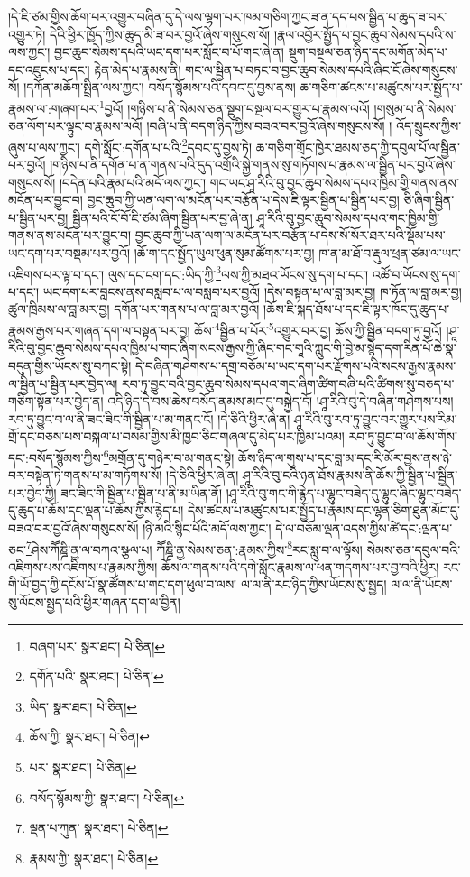 །དེ་ཇི་ཙམ་གྱིས་ཆོག་པར་འགྱུར་བཞིན་དུ་དེ་ལས་ལྷག་པར་ཁམ་གཅིག་ཀྱང་ཟ་ན་དད་པས་སྦྱིན་པ་ཆུད་ཟ་བར་འགྱུར་ཏེ། དེའི་ཕྱིར་ཁྱོད་ཀྱིས་ཆུད་མི་ཟ་བར་བྱའོ་ཞེས་གསུངས་སོ། །རྣལ་འབྱོར་སྤྱོད་པ་བྱང་ཆུབ་སེམས་དཔའི་ས་ལས་ཀྱང་། བྱང་ཆུབ་སེམས་དཔའི་ཡང་དག་པར་སློང་བ་པོ་གང་ཞེ་ན། སྡུག་བསྔལ་ཅན་ཉིད་དང་མགོན་མེད་པ་དང་འཇུངས་པ་དང་། རྟེན་མེད་པ་རྣམས་ནི། གང་ལ་སྦྱིན་པ་བཏང་བ་བྱང་ཆུབ་སེམས་དཔའི་ཞིང་ངོ་ཞེས་གསུངས་སོ། །དཀོན་མཆོག་སྤྲིན་ལས་ཀྱང་། བསོད་སྙོམས་པའི་དབང་དུ་བྱས་ནས། ཆ་གཅིག་ཚངས་པ་མཚུངས་པར་སྤྱོད་པ་རྣམས་ལ་:གཞག་པར་\footnote{བཞག་པར་  སྣར་ཐང་།  པེ་ཅིན། }བྱའོ། །གཉིས་པ་ནི་སེམས་ཅན་སྡུག་བསྔལ་བར་གྱུར་པ་རྣམས་ལའོ། །གསུམ་པ་ནི་སེམས་ཅན་ལོག་པར་ལྟུང་བ་རྣམས་ལའོ། །བཞི་པ་ནི་བདག་ཉིད་ཀྱིས་བཟའ་བར་བྱའོ་ཞེས་གསུངས་སོ། །
འོད་སྲུངས་ཀྱིས་ཞུས་པ་ལས་ཀྱང་། དགེ་སློང་:དགོན་པ་པའི་\footnote{དགོན་པའི་  སྣར་ཐང་།  པེ་ཅིན། }དབང་དུ་བྱས་ཏེ། ཆ་གཅིག་གྲོང་ཁྱེར་ཐམས་ཅད་ཀྱི་དབུལ་པོ་ལ་སྦྱིན་པར་བྱའོ། །གཉིས་པ་ནི་དགོན་པ་ན་གནས་པའི་དུད་འགྲོའི་སྐྱེ་གནས་སུ་གཏོགས་པ་རྣམས་ལ་སྦྱིན་པར་བྱའོ་ཞེས་གསུངས་སོ། །བདེན་པའི་རྣམ་པའི་མདོ་ལས་ཀྱང་། གང་ཡང་ཤཱ་རིའི་བུ་བྱང་ཆུབ་སེམས་དཔའ་ཁྱིམ་གྱི་གནས་ནས་མངོན་པར་བྱུང་བ། བྱང་ཆུབ་ཀྱི་ཡན་ལག་ལ་མངོན་པར་བརྩོན་པ་དེས་ཇི་ལྟར་སྦྱིན་པ་སྦྱིན་པར་བྱ། ཅི་ཞིག་སྦྱིན་པ་སྦྱིན་པར་བྱ། སྦྱིན་པའི་ངོ་བོ་ཇི་ཙམ་ཞིག་སྦྱིན་པར་བྱ་ཞེ་ན། ཤཱ་རིའི་བུ་བྱང་ཆུབ་སེམས་དཔའ་གང་ཁྱིམ་གྱི་གནས་ནས་མངོན་པར་བྱུང་བ། བྱང་ཆུབ་ཀྱི་ཡན་ལག་ལ་མངོན་པར་བརྩོན་པ་དེས་སོ་སོར་ཐར་པའི་སྡོམ་པས་ཡང་དག་པར་བསྡམ་པར་བྱའོ། །ཆོ་ག་དང་སྤྱོད་ཡུལ་ཕུན་སུམ་ཚོགས་པར་བྱ། ཁ་ན་མ་ཐོ་བ་རྡུལ་ཕྲན་ཙམ་ལ་ཡང་འཇིགས་པར་ལྟ་བ་དང་། ལུས་དང་ངག་དང་:ཡིད་ཀྱི་\footnote{ཡིད་  སྣར་ཐང་།  པེ་ཅིན། }ལས་ཀྱི་མཐའ་ཡོངས་སུ་དག་པ་དང་། འཚོ་བ་ཡོངས་སུ་དག་པ་དང་། ཡང་དག་པར་བླངས་ནས་བསླབ་པ་ལ་བསླབ་པར་བྱའོ། །དེས་བསྟན་པ་ལ་བླ་མར་བྱ། ཁ་ཏོན་ལ་བླ་མར་བྱ། ཚུལ་ཁྲིམས་ལ་བླ་མར་བྱ། དགོན་པར་གནས་པ་ལ་བླ་མར་བྱའོ། །ཆོས་ཇི་སྐད་ཐོས་པ་དང་ཇི་ལྟར་ཁོང་དུ་ཆུད་པ་རྣམས་རྒྱས་པར་གཞན་དག་ལ་བསྟན་པར་བྱ། ཆོས་\footnote{ཆོས་ཀྱི་  སྣར་ཐང་།  པེ་ཅིན། }སྦྱིན་པ་པོར་\footnote{པར་  སྣར་ཐང་།  པེ་ཅིན། }འགྱུར་བར་བྱ། ཆོས་ཀྱི་སྦྱིན་བདག་ཏུ་བྱའོ། །ཤཱ་རིའི་བུ་བྱང་ཆུབ་སེམས་དཔའ་ཁྱིམ་པ་གང་ཞིག་སངས་རྒྱས་ཀྱི་ཞིང་གང་གཱའི་ཀླུང་གི་བྱེ་མ་སྙེད་དག་རིན་པོ་ཆེ་སྣ་བདུན་གྱིས་ཡོངས་སུ་བཀང་སྟེ། དེ་བཞིན་གཤེགས་པ་དགྲ་བཅོམ་པ་ཡང་དག་པར་རྫོགས་པའི་སངས་རྒྱས་རྣམས་ལ་སྦྱིན་པ་སྦྱིན་པར་བྱེད་ལ། རབ་ཏུ་བྱུང་བའི་བྱང་ཆུབ་སེམས་དཔའ་གང་ཞིག་ཚིག་བཞི་པའི་ཚིགས་སུ་བཅད་པ་གཅིག་སྟོན་པར་བྱེད་ན། འདི་ཉིད་དེ་བས་ཆེས་བསོད་ནམས་མང་དུ་བསྐྱེད་དོ། །ཤཱ་རིའི་བུ་དེ་བཞིན་གཤེགས་པས། རབ་ཏུ་བྱུང་བ་ལ་ནི་ཟང་ཟིང་གི་སྦྱིན་པ་མ་གནང་ངོ། །དེ་ཅིའི་ཕྱིར་ཞེ་ན། ཤཱ་རིའི་བུ་རབ་ཏུ་བྱུང་བར་གྱུར་པས་རིམ་གྲོ་དང་བཅས་པས་བསྐལ་པ་བསམ་གྱིས་མི་ཁྱབ་ཅིང་གཞལ་དུ་མེད་པར་ཁྱིམ་པའམ། རབ་ཏུ་བྱུང་བ་ལ་ཆོས་གོས་དང་:བསོད་སྙོམས་ཀྱིས་\footnote{བསོད་སྙོམས་ཀྱི་  སྣར་ཐང་།  པེ་ཅིན། }མགྲོན་དུ་གཉེར་བ་མ་གནང་སྟེ། ཆོས་ཉིད་ལ་གུས་པ་དང་བླ་མ་དང་རི་མོར་བྱས་ནས་ཉེ་བར་བསྟེན་ཏེ་གནས་པ་མ་གཏོགས་སོ། །དེ་ཅིའི་ཕྱིར་ཞེ་ན། ཤཱ་རིའི་བུ་ངའི་ཉན་ཐོས་རྣམས་ནི་ཆོས་ཀྱི་སྦྱིན་པ་སྦྱིན་པར་བྱེད་ཀྱི། ཟང་ཟིང་གི་སྦྱིན་པ་སྦྱིན་པ་ནི་མ་ཡིན་ནོ། །ཤཱ་རིའི་བུ་གང་གི་རྙེད་པ་ལྷུང་བཟེད་དུ་ལྷུང་ཞིང་ལྷུང་བཟེད་དུ་ཆུད་པ་ཆོས་དང་ལྡན་པ་ཆོས་ཀྱིས་རྙེད་པ། དེས་ཚངས་པ་མཚུངས་པར་སྤྱོད་པ་རྣམས་དང་ལྷན་ཅིག་ཐུན་མོང་དུ་བཟའ་བར་བྱའོ་ཞེས་གསུངས་སོ། །ཉི་མའི་སྙིང་པོའི་མདོ་ལས་ཀྱང་། དེ་ལ་བཅོམ་ལྡན་འདས་ཀྱིས་ཚེ་དང་:ལྡན་པ་ཅང་\footnote{ལྡན་པ་ཀུན་  སྣར་ཐང་།  པེ་ཅིན། }ཤེས་ཀཽཎྜི་ནྱ་ལ་བཀའ་སྩལ་པ། ཀཽཎྜི་ནྱ་སེམས་ཅན་:རྣམས་ཀྱིས་\footnote{རྣམས་ཀྱི་  སྣར་ཐང་།  པེ་ཅིན། }རང་སླུ་བ་ལ་ལྟོས། སེམས་ཅན་དབུལ་བའི་འཇིགས་པས་འཇིགས་པ་རྣམས་ཀྱིས། ཆོས་ལ་གནས་པའི་དགེ་སློང་རྣམས་ལ་ཕན་གདགས་པར་བྱ་བའི་ཕྱིར། རང་གི་ཡོ་བྱད་ཀྱི་དངོས་པོ་སྣ་ཚོགས་པ་གང་དག་ཕུལ་བ་ལས། ལ་ལ་ནི་རང་ཉིད་ཀྱིས་ཡོངས་སུ་སྤྱད། ལ་ལ་ནི་ཡོངས་སུ་ལོངས་སྤྱད་པའི་ཕྱིར་གཞན་དག་ལ་བྱིན། 